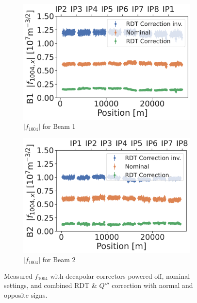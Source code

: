 \begin{figure}[!htb]
    \centering
    \begin{subfigure}{0.48\textwidth}
        \includegraphics[width=1\textwidth]{./images/f1004/f1004x_corrections_B1.pdf}
        \caption{$|f_{1004}|$ for Beam 1}
    \end{subfigure}
    \hfill
    \begin{subfigure}{0.48\textwidth}
        \includegraphics[width=1\textwidth]{./images/f1004/f1004x_corrections_B2.pdf}
        \caption{$|f_{1004}|$ for Beam 2}
    \end{subfigure}
    \caption{Measured $f_{1004}$ with decapolar correctors powered off, nominal settings, and
    combined RDT \& $Q'''$ correction with normal and opposite signs.}
    \label{fig:decapoles:rdts:f1004_correction_B2}
\end{figure}


